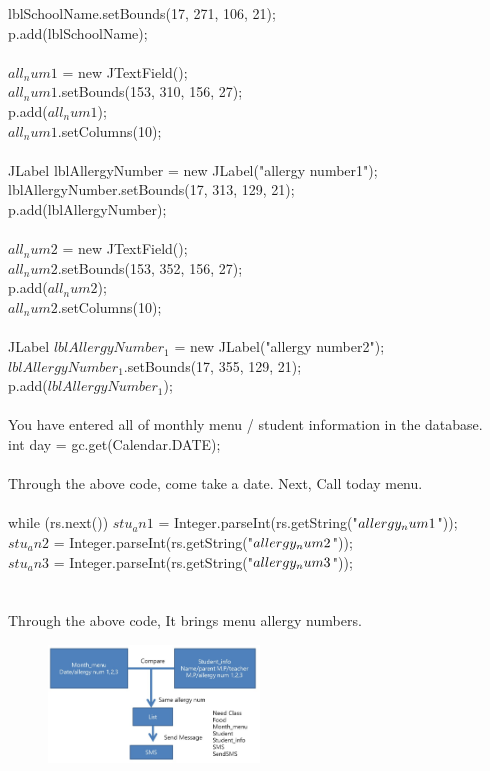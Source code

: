 \documentclass[a4paper,11pt]{IEEEtran}
\begin{document}
{{{{lblSchoolName.setBounds(17, 271, 106, 21);\\
p.add(lblSchoolName);\\
~\\
$all_num1$ = new JTextField();\\
$all_num1$.setBounds(153, 310, 156, 27);\\
p.add($all_num1$);\\
$all_num1$.setColumns(10);\\
~\\
JLabel lblAllergyNumber = new JLabel("allergy number1");\\
lblAllergyNumber.setBounds(17, 313, 129, 21);\\
p.add(lblAllergyNumber);\\
~\\
$all_num2$ = new JTextField();\\
$all_num2$.setBounds(153, 352, 156, 27);\\
p.add($all_num2$);\\
$all_num2$.setColumns(10);\\
~\\
JLabel $lblAllergyNumber_1$ = new JLabel("allergy number2");\\
$lblAllergyNumber_1$.setBounds(17, 355, 129, 21);\\
p.add($lblAllergyNumber_1$);\\\\
You have entered all of monthly menu / student information in the database.
~\\
 int day = gc.get(Calendar.DATE);\\
~\\
Through the above code, come take a date. Next, Call today menu.\\
~\\
while (rs.next()) {
$stu_an1$ = Integer.parseInt(rs.getString("$allerg\\y_num1$"));\\
$stu_an2$ = Integer.parseInt(rs.getString("$allerg\\y_num2$"));\\
$stu_an3$ = Integer.parseInt(rs.getString("$allerg\\y_num3$"));\\
}\\
~\\
Through the above code, It brings menu allergy numbers.
\newpage
\begin{figure}[!h]
        \centering
        \includegraphics[width=0.5\textwidth, height=0.5\textheight]{oa3.jpg}

\end{figure}}}}}
\end{document}
